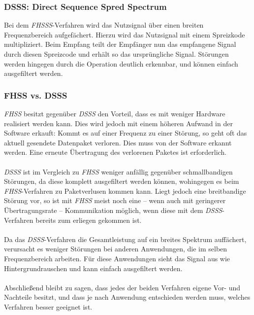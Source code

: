         \subsubsection{DSSS: Direct Sequence Spred Spectrum}\label{DSSS}
            Bei dem \textsl{FHSSS}-Verfahren wird das Nutzsignal über einen breiten Frequenzbereich
            aufgefächert. Hierzu wird das Nutzsignal mit einem Spreizkode multipliziert. 
            Beim Empfang teilt der Empfänger nun das empfangene Signal durch diesen Spreizcode
            und erhält so das ursprüngliche Signal. Störungen werden hingegen durch die 
            Operation deutlich erkennbar, und können einfach ausgefiltert werden.
        \subsubsection{FHSS vs. DSSS}\label{FHSSvsDSSS}
            \textsl{FHSS} besitzt gegenüber \textsl{DSSS} den Vorteil, dass es mit weniger Hardware
            realisiert werden kann. 
            Dies wird jedoch mit einem höheren Aufwand in der Software erkauft: Kommt es auf einer
            Frequenz zu einer Störung, so geht oft das aktuell gesendete Datenpaket verloren.
            Dies muss von der Software erkannt werden. Eine erneute Übertragung des verlorenen
            Paketes ist erforderlich.\\
            \\
            \textsl{DSSS} ist im Vergleich zu \textsl{FHSS} weniger anfällig gegenüber
            schmallbandigen Störungen, da diese komplett ausgefiltert werden können, 
            wohingegen es beim \textsl{FHSS}-Verfahren zu Paketverlusen kommen kann.
            Liegt jedoch eine breitbandige Störung vor, so ist mit \textsl{FHSS}
            meist noch eine -- wenn auch mit geringerer Übertragungsrate -- Kommunikation
            möglich, wenn diese mit dem \textsl{DSSS}-Verfahren bereits zum erliegen gekommen ist.\\
            \\
            Da das \textsl{DSSS}-Verfahren die Gesamtleistung auf ein breites Spektrum auffächert,
            verursacht es weniger Störungen bei anderen Anwendungen, die im selben Frequenzbereich
            arbeiten. Für diese Anwendungen sieht das Signal aus wie Hintergrundrauschen und kann
            einfach ausgefiltert werden.\\
            \\
            Abschließend bleibt zu sagen, dass jedes der beiden Verfahren eigene Vor- und Nachteile
            besitzt, und dass je nach Anwendung entschieden werden muss, welches Verfahren
            besser geeignet ist.
            



